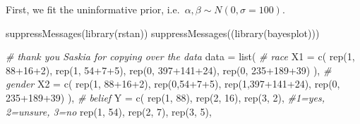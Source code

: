 \documentclass[
]{article}
\newenvironment{Shaded}{\begin{snugshade}}{\end{snugshade}}
\newcommand{\AttributeTok}[1]{\textcolor[rgb]{0.77,0.63,0.00}{#1}}
\newcommand{\CommentTok}[1]{\textcolor[rgb]{0.56,0.35,0.01}{\textit{#1}}}
\newcommand{\DecValTok}[1]{\textcolor[rgb]{0.00,0.00,0.81}{#1}}
\newcommand{\FunctionTok}[1]{\textcolor[rgb]{0.00,0.00,0.00}{#1}}
\newcommand{\NormalTok}[1]{#1}
\newcommand{\OtherTok}[1]{\textcolor[rgb]{0.56,0.35,0.01}{#1}}
\newcommand{\SpecialCharTok}[1]{\textcolor[rgb]{0.00,0.00,0.00}{#1}}
\begin{document}
First, we fit the uninformative prior,
i.e.~\(\alpha, \beta \sim N(0, \sigma=100)\).

\begin{Shaded}
\begin{Highlighting}[]
\FunctionTok{suppressMessages}\NormalTok{(}\FunctionTok{library}\NormalTok{(rstan))}
\FunctionTok{suppressMessages}\NormalTok{((}\FunctionTok{library}\NormalTok{(bayesplot)))}

\CommentTok{\# thank you Saskia for copying over the data}
\NormalTok{data }\OtherTok{=} \FunctionTok{list}\NormalTok{(}
  \CommentTok{\# race}
  \AttributeTok{X1 =} \FunctionTok{c}\NormalTok{(}
    \FunctionTok{rep}\NormalTok{(}\DecValTok{1}\NormalTok{, }\DecValTok{88}\SpecialCharTok{+}\DecValTok{16}\SpecialCharTok{+}\DecValTok{2}\NormalTok{), }\FunctionTok{rep}\NormalTok{(}\DecValTok{1}\NormalTok{, }\DecValTok{54}\SpecialCharTok{+}\DecValTok{7}\SpecialCharTok{+}\DecValTok{5}\NormalTok{), }\FunctionTok{rep}\NormalTok{(}\DecValTok{0}\NormalTok{, }\DecValTok{397}\SpecialCharTok{+}\DecValTok{141}\SpecialCharTok{+}\DecValTok{24}\NormalTok{), }\FunctionTok{rep}\NormalTok{(}\DecValTok{0}\NormalTok{, }\DecValTok{235}\SpecialCharTok{+}\DecValTok{189}\SpecialCharTok{+}\DecValTok{39}\NormalTok{)}
\NormalTok{  ),}
  \CommentTok{\# gender}
  \AttributeTok{X2 =} \FunctionTok{c}\NormalTok{(}
    \FunctionTok{rep}\NormalTok{(}\DecValTok{1}\NormalTok{, }\DecValTok{88}\SpecialCharTok{+}\DecValTok{16}\SpecialCharTok{+}\DecValTok{2}\NormalTok{), }\FunctionTok{rep}\NormalTok{(}\DecValTok{0}\NormalTok{,}\DecValTok{54}\SpecialCharTok{+}\DecValTok{7}\SpecialCharTok{+}\DecValTok{5}\NormalTok{), }\FunctionTok{rep}\NormalTok{(}\DecValTok{1}\NormalTok{,}\DecValTok{397}\SpecialCharTok{+}\DecValTok{141}\SpecialCharTok{+}\DecValTok{24}\NormalTok{), }\FunctionTok{rep}\NormalTok{(}\DecValTok{0}\NormalTok{, }\DecValTok{235}\SpecialCharTok{+}\DecValTok{189}\SpecialCharTok{+}\DecValTok{39}\NormalTok{)}
\NormalTok{  ),}
  \CommentTok{\# belief}
  \AttributeTok{Y =} \FunctionTok{c}\NormalTok{(}
    \FunctionTok{rep}\NormalTok{(}\DecValTok{1}\NormalTok{, }\DecValTok{88}\NormalTok{), }\FunctionTok{rep}\NormalTok{(}\DecValTok{2}\NormalTok{, }\DecValTok{16}\NormalTok{), }\FunctionTok{rep}\NormalTok{(}\DecValTok{3}\NormalTok{, }\DecValTok{2}\NormalTok{), }\CommentTok{\#1=yes, 2=unsure, 3=no}
    \FunctionTok{rep}\NormalTok{(}\DecValTok{1}\NormalTok{, }\DecValTok{54}\NormalTok{), }\FunctionTok{rep}\NormalTok{(}\DecValTok{2}\NormalTok{, }\DecValTok{7}\NormalTok{), }\FunctionTok{rep}\NormalTok{(}\DecValTok{3}\NormalTok{, }\DecValTok{5}\NormalTok{),}

\end{Highlighting}
\end{Shaded}
\end{document}
